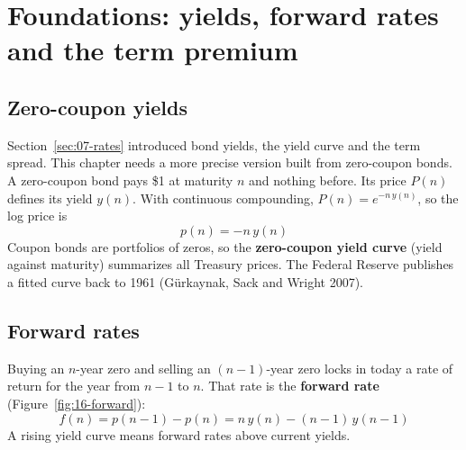 \section{Foundations: yields, forward rates and the term premium}
\label{sec:16-foundations}

\subsection{Zero-coupon yields}

Section~\ref{sec:07-rates} introduced bond yields, the yield curve and the term spread. This chapter needs a more precise version built from zero-coupon bonds. A zero-coupon bond pays \$1 at maturity $n$ and nothing before. Its price $P(n)$ defines its yield $y(n)$. With continuous compounding, $P(n) = e^{-n\,y(n)}$, so the log price is
\begin{equation}
  p(n) = -n\,y(n)
  \label{eq:16-logprice}
\end{equation}
Coupon bonds are portfolios of zeros, so the \textbf{zero-coupon yield curve} (yield against maturity) summarizes all Treasury prices. The Federal Reserve publishes a fitted curve back to 1961 (G\"urkaynak, Sack and Wright 2007).

\subsection{Forward rates}

Buying an $n$-year zero and selling an $(n-1)$-year zero locks in today a rate of return for the year from $n-1$ to $n$. That rate is the \textbf{forward rate} (Figure~\ref{fig:16-forward}):
\begin{equation}
  f(n) = p(n-1) - p(n) = n\,y(n) - (n-1)\,y(n-1)
  \label{eq:16-forward}
\end{equation}
A rising yield curve means forward rates above current yields.

